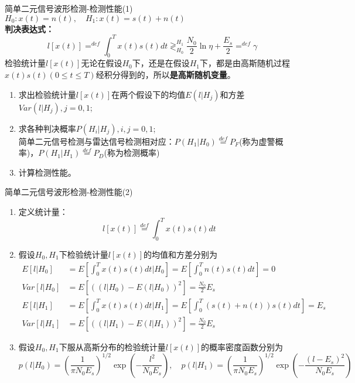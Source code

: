 \begin{frame}{简单二元信号波形检测-检测性能(1)}
$H_0: x(t)=n(t), \quad H_1: x(t)=s(t)+n(t)$\\
\textbf{判决表达式：}
\[l[x(t)]\mathop{=}^{def}\int_{0}^{T}x(t)s(t)dt\mathop{\gtrless}_{H_0}^{H_1}\frac{N_0}{2}\ln\eta+\frac{E_s}{2}\mathop{=}^{def}\gamma \]
检验统计量$l[x(t)]$无论在假设$H_0$下，还是在假设$H_1$下，都是由高斯随机过程$x(t)s(t)(0\le t\le T)$经积分得到的，所以\textbf{是高斯随机变量}。
\begin{enumerate}
	\item 求出检验统计量$l[x(t)]$在两个假设下的均值$E(l|H_j)$和方差$Var(l|H_j),j=0,1$;
	\item 求各种判决概率$P(H_i|H_j),i,j=0,1$;\\
	简单二元信号检测与雷达信号检测相对应：$P(H_1|H_0)\mathop{=}\limits^{def}P_F$(称为虚警概率)，$P(H_1|H_1)\mathop{=}\limits^{def}P_D$(称为检测概率)
	\item 计算检测性能。
\end{enumerate}
\end{frame}

\begin{frame}[shrink]{简单二元信号波形检测-检测性能(2)}
\begin{enumerate}[1]
\item 定义统计量：
\[l[x(t)]\mathop{=}\limits^{def}\int_{0}^{T}x(t)s(t)dt \]
\item 假设$H_0,H_1$下检验统计量$l[x(t)]$的均值和方差分别为
\begin{align*}
E[l|H_0]&=E\left[\int_{0}^{T}x(t)s(t)dt|H_0\right]=E\left[\int_{0}^{T}n(t)s(t)dt\right]=0\\ 
Var[l|H_0]&=E[((l|H_0)-E(l|H_0))^2]=\frac{N_0}{2}E_s\\
E[l|H_1]&=E\left[\int_{0}^{T}x(t)s(t)dt|H_1\right]=E\left[\int_{0}^{T}(s(t)+n(t))s(t)dt\right]=E_s\\
Var[l|H_1]&=E[((l|H_1)-E(l|H_1))^2]=\frac{N_0}{2}E_s
\end{align*}
\item 假设$H_0,H_1$下服从高斯分布的检验统计量$l[x(t)]$的概率密度函数分别为\\
\[p(l|H_0)=\left(\frac{1}{\pi N_0E_s}\right)^{1/2}\exp\left(-\frac{l^2}{N_0E_s}\right),\quad p(l|H_1)=\left(\frac{1}{\pi N_0E_s}\right)^{1/2}\exp\left(-\frac{(l-E_s)^2}{N_0E_s}\right)\]
\end{enumerate}
\end{frame}

